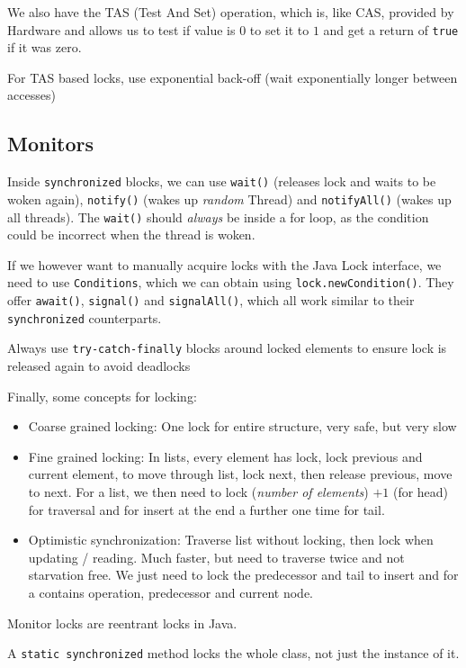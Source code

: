 \documentclass{article}
\begin{document}
We also have the TAS (Test And Set) operation, which is, like CAS, provided by Hardware and allows us to test if value is $0$ to set it to $1$ and get a return of \verb|true| if it was zero.

For TAS based locks, use exponential back-off (wait exponentially longer between accesses)


\subsection{Monitors}
Inside \verb|synchronized| blocks, we can use \verb|wait()| (releases lock and waits to be woken again), \verb|notify()| (wakes up \textit{random} Thread) and \verb|notifyAll()| (wakes up all threads). The \verb|wait()| should \textit{always} be inside a for loop, as the condition could be incorrect when the thread is woken.

If we however want to manually acquire locks with the Java Lock interface, we need to use \verb|Conditions|, which we can obtain using \verb|lock.newCondition()|.
They offer \verb|await()|, \verb|signal()| and \verb|signalAll()|, which all work similar to their \verb|synchronized| counterparts.

 Always use \verb|try-catch-finally| blocks around locked elements to ensure lock is released again to avoid deadlocks

Finally, some concepts for locking:
\begin{itemize}
    \item Coarse grained locking: One lock for entire structure, very safe, but very slow
    \item Fine grained locking: In lists, every element has lock, lock previous and current element, to move through list, lock next, then release previous, move to next. For a list, we then need to lock (\textit{number of elements}) $+ 1$ (for head) for traversal and for insert at the end a further one time for tail.
    \item Optimistic synchronization: Traverse list without locking, then lock when updating / reading. Much faster, but need to traverse twice and not starvation free. We just need to lock the predecessor and tail to insert and for a contains operation, predecessor and current node.
\end{itemize}
Monitor locks are reentrant locks in Java. 

A \verb|static synchronized| method locks the whole class, not just the instance of it.
\end{document}
